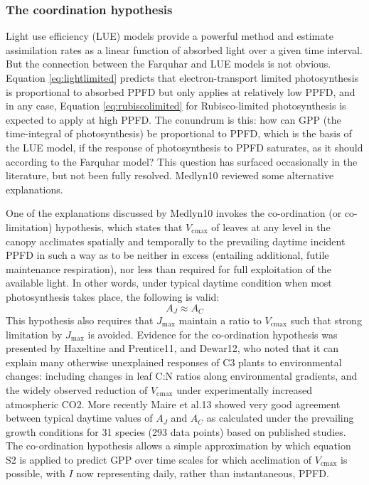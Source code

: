 \documentclass{myreport}
\begin{document}
\subsubsection{The coordination hypothesis}
\label{sec:coordination}
Light use efficiency (LUE) models provide a powerful method and estimate assimilation rates as a linear function of absorbed light over a given time interval. 
But the connection between the Farquhar and LUE models is not obvious. 
Equation \ref{eq:lightlimited} predicts that electron-transport limited photosynthesis is proportional to absorbed PPFD but only applies at relatively low PPFD, and in any case, Equation \ref{eq:rubiscolimited} for Rubisco-limited photosynthesis is expected to apply at high PPFD. 
The conundrum is this: how can GPP (the time-integral of photosynthesis) be proportional to PPFD, which is the basis of the LUE model, if the response of photosynthesis to PPFD saturates, as it should according to the Farquhar model? This question has surfaced occasionally in the literature, but not been fully resolved. 
Medlyn10 reviewed some alternative explanations.
 
One of the explanations discussed by Medlyn10 invokes the co-ordination (or co-limitation) hypothesis, which states that $V_{\mathrm{cmax}}$ of leaves at any level in the canopy acclimates spatially and temporally to the prevailing daytime incident PPFD in such a way as to be neither in excess (entailing additional, futile maintenance respiration), nor less than required for full exploitation of the available light. 
In other words, under typical daytime condition when most photosynthesis takes place, the following is valid:
\begin{equation}
\label{eq:coordination}
    A_J \approx A_C
\end{equation}
This hypothesis also requires that $J_{\mathrm{max}}$ maintain a ratio to $V_{\mathrm{cmax}}$ such that strong limitation by $J_{\mathrm{max}}$ is avoided. 
Evidence for the co-ordination hypothesis was presented by Haxeltine and Prentice11, and Dewar12, who noted that it can explain many otherwise unexplained responses of C3 plants to environmental changes: including changes in leaf C:N ratios along environmental gradients, and the widely observed reduction of $V_{\mathrm{cmax}}$ under experimentally increased atmospheric CO2. More recently Maire et al.13 showed very good agreement between typical daytime values of $A_J$ and $A_C$ as calculated under the prevailing growth conditions for 31 species (293 data points) based on published studies. 
The co-ordination hypothesis allows a simple approximation by which equation S2 is applied to predict GPP over time scales for which acclimation of $V_{\mathrm{cmax}}$ is possible, with $I$ now representing daily, rather than instantaneous, PPFD.
\end{document}
